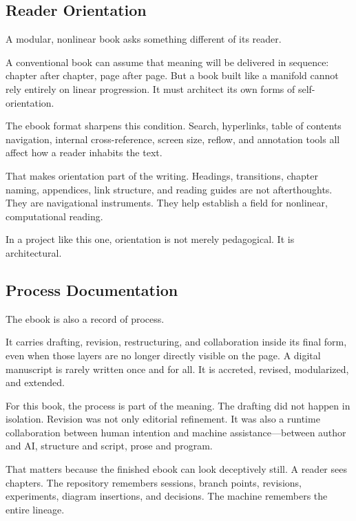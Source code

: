 \hypertarget{reader-orientation}{%
\subsection{Reader Orientation}\label{reader-orientation}}

A modular, nonlinear book asks something different of its reader.

A conventional book can assume that meaning will be delivered in
sequence: chapter after chapter, page after page. But a book built like
a manifold cannot rely entirely on linear progression. It must architect
its own forms of self-orientation.

The ebook format sharpens this condition. Search, hyperlinks, table of
contents navigation, internal cross-reference, screen size, reflow, and
annotation tools all affect how a reader inhabits the text.

That makes orientation part of the writing. Headings, transitions,
chapter naming, appendices, link structure, and reading guides are not
afterthoughts. They are navigational instruments. They help establish a
field for nonlinear, computational reading.

In a project like this one, orientation is not merely pedagogical. It is
architectural.

\hypertarget{process-documentation}{%
\subsection{Process Documentation}\label{process-documentation}}

The ebook is also a record of process.

It carries drafting, revision, restructuring, and collaboration inside
its final form, even when those layers are no longer directly visible on
the page. A digital manuscript is rarely written once and for all. It is
accreted, revised, modularized, and extended.

For this book, the process is part of the meaning. The drafting did not
happen in isolation. Revision was not only editorial refinement. It was
also a runtime collaboration between human intention and machine
assistance---between author and AI, structure and script, prose and
program.

That matters because the finished ebook can look deceptively still. A
reader sees chapters. The repository remembers sessions, branch points,
revisions, experiments, diagram insertions, and decisions. The machine
remembers the entire lineage.

